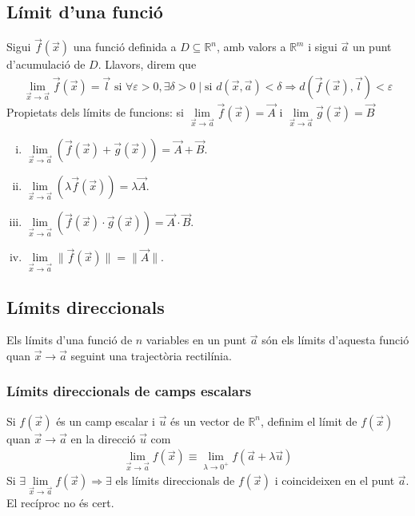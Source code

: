 \subsection{Límit d'una funció}
Sigui $\vec{f}(\vec{x})$ una funció definida a $D \subseteq \mathbb{R}^{n}$, amb valors a $\mathbb{R}^{m}$ i sigui $\vec{a}$ un punt d'acumulació de $D$. Llavors, direm que
\begin{align}
    \lim_{\vec{x} \to \vec{a}} \vec{f}(\vec{x}) = \vec{l} \text{ si } \forall \varepsilon > 0, \exists \delta > 0 \mid \text{si }d(\vec{x}, \vec{a}) < \delta \Rightarrow d(\vec{f}(\vec{x}), \vec{l}) < \varepsilon
\end{align}
Propietats dels límits de funcions: si $\lim\limits_{\vec{x} \to \vec{a}} \vec{f}(\vec{x}) = \vec{A}$ i $\lim\limits_{\vec{x} \to \vec{a}} \vec{g}(\vec{x}) = \vec{B}$
\begin{enumerate}[i)]
    \item $\lim\limits_{\vec{x} \to \vec{a}} (\vec{f}(\vec{x}) + \vec{g}(\vec{x})) = \vec{A} + \vec{B}$.
    \item $\lim\limits_{\vec{x} \to \vec{a}} ( \lambda \vec{f}(\vec{x})) = \lambda \vec{A}$.
    \item $\lim\limits_{\vec{x} \to \vec{a}} ( \vec{f}(\vec{x}) \cdot \vec{g}(\vec{x}))= \vec{A} \cdot \vec{B}$.
    \item $\lim\limits_{\vec{x} \to \vec{a}} \| \vec{f}(\vec{x}) \| = \| \vec{A} \|$.
\end{enumerate}

\subsection{Límits direccionals}
\begin{defi}
    Els límits d'una funció de $n$ variables en un punt $\vec{a}$ són els límits d'aquesta funció quan $\vec{x} \to \vec{a}$ seguint una trajectòria rectilínia.
\end{defi}

\subsubsection*{Límits direccionals de camps escalars}
Si $f(\vec{x})$ és un camp escalar i $\vec{u}$ és un vector de $\mathbb{R}^{n}$, definim el límit de $f(\vec{x})$ quan $\vec{x} \to \vec{a}$ en la direcció $\vec{u}$ com
\begin{align}
    \lim_{\vec{x} \to \vec{a}} f(\vec{x}) \equiv \lim_{\lambda \to 0^{+}} f(\vec{a} + \lambda \vec{u})
\end{align}
Si $\exists \lim\limits_{\vec{x} \to \vec{a}} f(\vec{x}) \Rightarrow \exists$ els límits direccionals de $f(\vec{x})$ i coincideixen en el punt $\vec{a}$. El recíproc no és cert.

